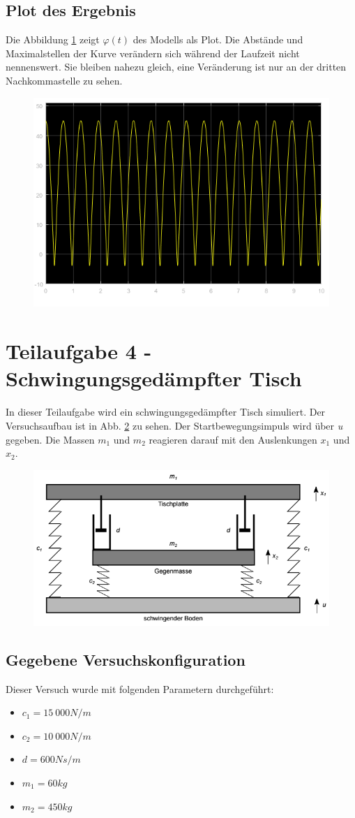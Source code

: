 \documentclass[]{scrartcl}
\begin{document}
\subsection{Plot des Ergebnis}
Die Abbildung \ref{fig:3_Plot} zeigt $\varphi(t)$ des Modells als Plot. Die Abstände und Maximalstellen der Kurve verändern sich während der Laufzeit nicht nennenswert. Sie bleiben nahezu gleich, eine Veränderung ist nur an der dritten Nachkommastelle zu sehen.

\begin{figure}[H]
\centering
\includegraphics[width=0.5\linewidth]{./3_Plot}
\caption{}
\label{fig:3_Plot}
\end{figure}

\section{Teilaufgabe 4 - Schwingungsgedämpfter Tisch}
In dieser Teilaufgabe wird ein schwingungsgedämpfter Tisch simuliert. Der Versuchsaufbau ist in Abb. \ref{fig:4_Versuchsaufbau} zu sehen. Der Startbewegungsimpuls wird über \textit{u} gegeben. Die Massen $m_{1}$ und $m_{2}$ reagieren darauf mit den Auslenkungen $x_{1}$ und $x_{2}$.

\begin{figure}[H]
\centering
\includegraphics[width=0.5\linewidth]{./4_Versuchsaufbau}
\caption{}
\label{fig:4_Versuchsaufbau}
\end{figure}

\subsection{Gegebene Versuchskonfiguration}
Dieser Versuch wurde mit folgenden Parametern durchgeführt:
\begin{itemize}
\item $c_{1} = 15\ 000 N/m$
\item $c_{2} = 10\ 000 N/m$
\item $d = 600 Ns/m$
\item $m_{1} = 60 kg$
\item $m_{2} = 450 kg$
\end{itemize}
\end{document}
